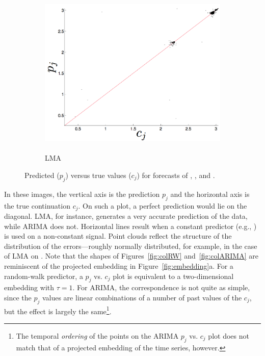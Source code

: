 \begin{figure}[htbp]
\begin{subfigure}{0.6\columnwidth}
    \includegraphics[width=\columnwidth]{figs/svdfiveLMAForecast.png}
    \caption{\svdfive \\ LMA}
    \label{fig:svd5LMA}
  \end{subfigure}
   \caption{Predicted ($p_j$) versus true values ($c_j$) for
     forecasts of \col, \gcc, and \svdfive.  
%
%
}
\label{fig:forecast-example}
\end{figure} 
In these images, the vertical axis is the prediction $p_j$ and the
horizontal axis is the true continuation $c_j$.  On such a plot, a
perfect prediction would lie on the diagonal.  LMA, for instance,
generates a very accurate prediction of the \col data, while ARIMA
does not.  Horizontal lines result when a constant predictor (e.g.,
\naive) is used on a non-constant signal.  Point clouds reflect the
structure of the distribution of the errors---roughly normally
distributed, for example, in the case of LMA on \gcc.  Note that the
shapes of Figures~\ref{fig:colRW} and~\ref{fig:colARIMA} are
reminiscent of the projected embedding in Figure~\ref{fig:embedding}a.
For a random-walk predictor, a $p_j$ vs. $c_j$ plot is equivalent to a
two-dimensional embedding with $\tau=1$.  For ARIMA, the
correspondence is not quite as simple, since the $p_j$ values are
linear combinations of a number of past values of the $c_j$, but the
effect is largely the same\footnote{The temporal \emph{ordering} of
  the points on the ARIMA $p_j$ vs. $c_j$ plot does not match that of
  a projected embedding of the time series, however.}.

